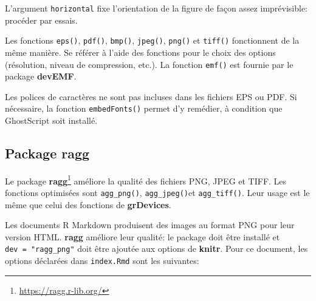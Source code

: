 \documentclass[
  12pt,
  french,
  a4paper,
  extrafontsizes,onecolumn,openright
  ]{memoir}
\newenvironment{Shaded}{\begin{snugshade}}{\end{snugshade}}
\newcommand{\CommentTok}[1]{\textcolor[rgb]{0.56,0.35,0.01}{\textit{#1}}}
\newcommand{\DataTypeTok}[1]{\textcolor[rgb]{0.13,0.29,0.53}{#1}}
\newcommand{\DecValTok}[1]{\textcolor[rgb]{0.00,0.00,0.81}{#1}}
\newcommand{\KeywordTok}[1]{\textcolor[rgb]{0.13,0.29,0.53}{\textbf{#1}}}
\newcommand{\NormalTok}[1]{#1}
\newcommand{\OperatorTok}[1]{\textcolor[rgb]{0.81,0.36,0.00}{\textbf{#1}}}
\newcommand{\OtherTok}[1]{\textcolor[rgb]{0.56,0.35,0.01}{#1}}
\newcommand{\StringTok}[1]{\textcolor[rgb]{0.31,0.60,0.02}{#1}}
\begin{document}
L'argument \texttt{horizontal} fixe l'orientation de la figure de façon assez imprévisible: procéder par essais.

Les fonctions \texttt{eps()}, \texttt{pdf()}, \texttt{bmp()}, \texttt{jpeg()}, \texttt{png()} et \texttt{tiff()} fonctionnent de la même manière.
Se référer à l'aide des fonctions pour le choix des options (résolution, niveau de compression, etc.).
La fonction \texttt{emf()} est fournie par le package \textbf{devEMF}.

Les polices de caractères ne sont pas incluses dans les fichiers EPS ou PDF.
Si nécessaire, la fonction \texttt{embedFonts()} permet d'y remédier, à condition que GhostScript soit installé.

\hypertarget{package-ragg}{%
\subsection{Package ragg}\label{package-ragg}}

Le package \textbf{ragg}\footnote{\url{https://ragg.r-lib.org/}} améliore la qualité des fichiers PNG, JPEG et TIFF.
Les fonctions optimisées sont \texttt{agg\_png()}, \texttt{agg\_jpeg()}et \texttt{agg\_tiff()}. Leur usage est le même que celui des fonctions de \textbf{grDevices}.

Les documents R Markdown produisent des images au format PNG pour leur version HTML.
\textbf{ragg} améliore leur qualité: le package doit être installé et \texttt{dev\ =\ "ragg\_png"} doit être ajoutée aux options de \textbf{knitr}.
Pour ce document, les options déclarées dans \texttt{index.Rmd} sont les suivantes:

\scriptsize

\begin{Shaded}
\end{Shaded}
\end{document}
